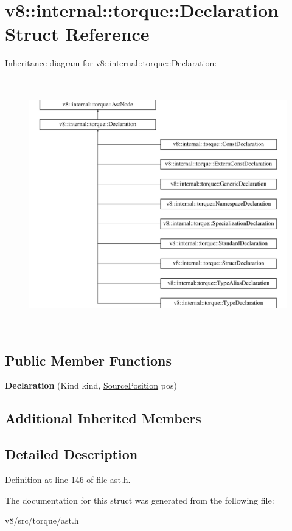 \hypertarget{structv8_1_1internal_1_1torque_1_1Declaration}{}\section{v8\+:\+:internal\+:\+:torque\+:\+:Declaration Struct Reference}
\label{structv8_1_1internal_1_1torque_1_1Declaration}
Inheritance diagram for v8\+:\+:internal\+:\+:torque\+:\+:Declaration\+:\begin{figure}[H]
\begin{center}
\leavevmode
\includegraphics[height=11.000000cm]{structv8_1_1internal_1_1torque_1_1Declaration}
\end{center}
\end{figure}
\subsection*{Public Member Functions}
\begin{DoxyCompactItemize}
\item 
\mbox{\label{structv8_1_1internal_1_1torque_1_1Declaration_a7b55ca141cb285f6f9a30b63152432a8}} 
{\bfseries Declaration} (Kind kind, \mbox{\hyperlink{structv8_1_1internal_1_1torque_1_1SourcePosition}{Source\+Position}} pos)
\end{DoxyCompactItemize}
\subsection*{Additional Inherited Members}


\subsection{Detailed Description}


Definition at line 146 of file ast.\+h.



The documentation for this struct was generated from the following file\+:\begin{DoxyCompactItemize}
\item 
v8/src/torque/ast.\+h\end{DoxyCompactItemize}
